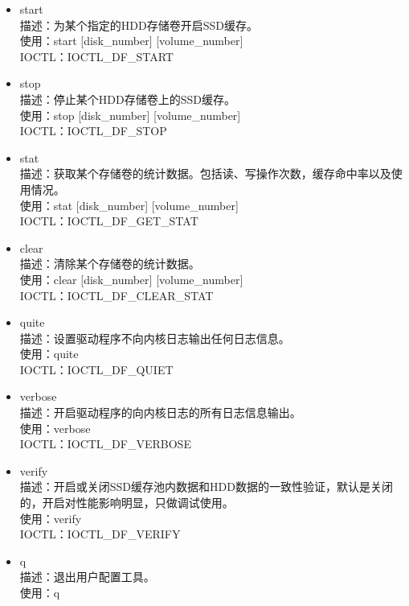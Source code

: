 \begin{itemize}
\item start
\\描述：为某个指定的HDD存储卷开启SSD缓存。
\\使用：start  [disk\_number]  [volume\_number]
\\IOCTL：IOCTL\_DF\_START

\item stop
\\描述：停止某个HDD存储卷上的SSD缓存。
\\使用：stop  [disk\_number]  [volume\_number]
\\IOCTL：IOCTL\_DF\_STOP

\item stat
\\描述：获取某个存储卷的统计数据。包括读、写操作次数，缓存命中率以及使用情况。
\\使用：stat  [disk\_number]  [volume\_number]
\\IOCTL：IOCTL\_DF\_GET\_STAT

\item clear
\\描述：清除某个存储卷的统计数据。
\\使用：clear  [disk\_number]  [volume\_number]
\\IOCTL：IOCTL\_DF\_CLEAR\_STAT

\item quite
\\描述：设置驱动程序不向内核日志输出任何日志信息。
\\使用：quite
\\IOCTL：IOCTL\_DF\_QUIET

\item verbose
\\描述：开启驱动程序的向内核日志的所有日志信息输出。
\\使用：verbose
\\IOCTL：IOCTL\_DF\_VERBOSE

\item verify
\\描述：开启或关闭SSD缓存池内数据和HDD数据的一致性验证，默认是关闭的，开启对性能影响明显，只做调试使用。
\\使用：verify
\\IOCTL：IOCTL\_DF\_VERIFY

\item q
\\描述：退出用户配置工具。
\\使用：q
\end{itemize}

